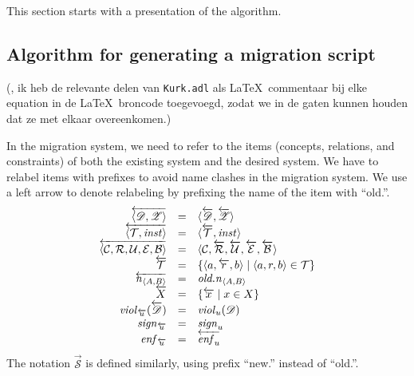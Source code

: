 \documentclass[runningheads]{llncs}
\newcommand{\id}[1]{\text{\it #1\/}}
\newcommand{\instance}{\mathbin{\id{inst}}}
\newcommand{\viol}[2]{\violC{#1}(#2)}
\newcommand{\violC}[1]{\id{viol}_{#1}}
\newcommand{\sign}[1]{\id{sign}_{#1}}
\newcommand{\enfRel}[1]{\id{enf}_{#1}}
\newcommand{\declare}[3]{\id{#1}_{\pair{#2}{#3}}}
\newcommand{\pair}[2]{\langle{#1},{#2}\rangle}
\newcommand{\triple}[3]{\langle{#1},{#2},{#3}\rangle}
\newcommand{\quintuple}[5]{\langle{#1},{#2},{#3},{#4},{#5}\rangle}
\newcommand{\concepts}{\mathcal{C}}
\newcommand{\rels}{\mathcal{R}}   %
\newcommand{\triples}{\mathcal{T}}
\newcommand{\rules}{\mathcal{U}}
\newcommand{\transactions}{\mathcal{E}}
\newcommand{\busConstraints}{\mathcal{B}}
\newcommand{\dataset}{\mathscr{D}}
\newcommand{\schema}{\mathscr{Z}}
\newcommand{\infsys}{\mathscr{S}}
\begin{document}
   This section starts with a presentation of the algorithm.

\subsection{Algorithm for generating a migration script}
   (\@Bas, ik heb de relevante delen van {\tt Kurk.adl} als \LaTeX\ commentaar bij elke equation in de \LaTeX\ broncode toegevoegd,
   zodat we in de gaten kunnen houden dat ze met elkaar overeenkomen.)

   In the migration system, we need to refer to the items (concepts, relations, and constraints) of both the existing system and the desired system.
   We have to relabel items with prefixes to avoid name clashes in the migration system.
   We use a left arrow to denote relabeling by prefixing the name of the item with ``old.''.
\begin{equation}
   \begin{array}[m]{rcl}
      \overleftarrow{\pair{\dataset}{\schema}}&=&\pair{\overleftarrow{\dataset}}{\overleftarrow{\schema}}\\
      \overleftarrow{\pair{\triples}{\instance}}&=&\pair{\overleftarrow{\triples}}{\instance}\\
      \overleftarrow{\quintuple{\concepts}{\rels}{\rules}{\transactions}{\busConstraints}}&=&\quintuple{\concepts}{\overleftarrow{\rels}}{\overleftarrow{\rules}}{\overleftarrow{\transactions}}{\overleftarrow{\busConstraints}}\\
      \overleftarrow{\triples}&=&\{\triple{a}{\overleftarrow{r}}{b}\mid\triple{a}{r}{b}\in\triples\}\\
      \overleftarrow{\declare{n}{A}{B}}&=&\declare{old.n}{A}{B}\\
      \overleftarrow{X}&=&\{\overleftarrow{x}\mid x\in X\}\\
      \viol{\overleftarrow{u}}{\overleftarrow{\dataset}}&=&\viol{u}{\dataset}\\
      \sign{\overleftarrow{u}}&=&\sign{u}\\
      \enfRel{\overleftarrow{u}}&=&\overleftarrow{\enfRel{u}}
   \end{array}
\end{equation}
   The notation $\overrightarrow{\infsys}$ is defined similarly, using prefix ``new.'' instead of ``old.''.
\end{document}
